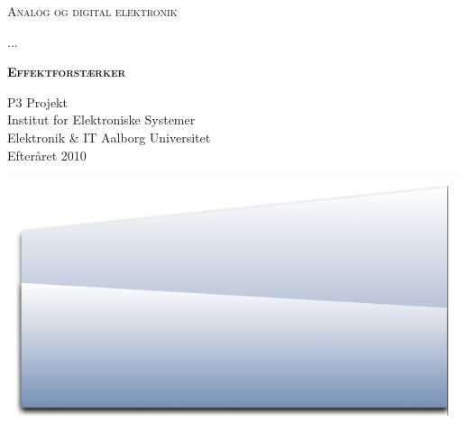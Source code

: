 \begin{center}
\textsc{\huge Analog og digital elektronik\\}
\vspace{5 mm}

\textsc{\Large ...\\}
\vspace{25 mm}

\textsc{\textbf{\HUGE Effektforstærker\\}}
\vspace{20 mm}

\begin{flushright}
P3 Projekt \\
Institut for Elektroniske Systemer \\
Elektronik \& IT Aalborg Universitet \\
Efteråret 2010 \\
\end{flushright}

\includegraphics[width=1.0\textwidth]{forside/forside.png}

\end{center}